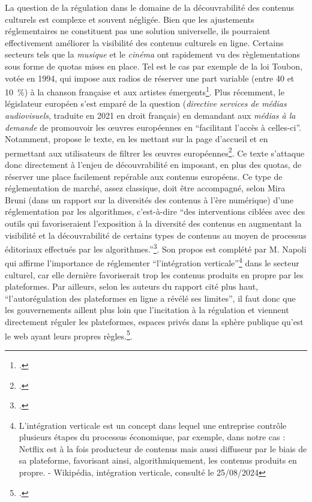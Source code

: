La question de la régulation dans le domaine de la découvrabilité des contenus culturels est complexe et souvent négligée. Bien que les ajustements réglementaires ne constituent pas une solution universelle, ils pourraient effectivement améliorer la visibilité des contenus culturels en ligne. Certains secteurs tels que la \textit{musique} et le \textit{cinéma} ont rapidement vu des règlementations sous forme de quotas mises en place. Tel est le cas par exemple de la loi Toubon, votée en 1994, qui impose aux radios de réserver une part variable (entre 40 et 10 \%) à la chanson française et aux artistes émergents\footcite{noauthor_comprendre_2016}. Plus récemment, le législateur européen s’est emparé de la question (\textit{directive services de médias audiovisuels}, traduite en 2021 en droit français) en demandant aux \textit{médias à la demande} de promouvoir les œuvres européennes en \enquote{facilitant l’accès à celles-ci}. Notamment, propose le texte, en les mettant sur la page d’accueil et en permettant aux utilisateurs de filtrer les œuvres européennes\footcite{noauthor_directive_2019}. Ce texte s’attaque donc directement à l’enjeu de découvrabilité en imposant, en plus des quotas, de réserver une place facilement repérable aux contenus européens. Ce type de réglementation de marché, assez classique, doit être accompagné, selon Mira Bruni (dans un rapport sur la diversités des contenus à l'ère numérique) d'une réglementation par les algorithmes, c'est-à-dire \enquote{des interventions ciblées avec des outils qui favoriseraient l'exposition à la diversité des contenus en augmentant la visibilité et la découvrabilité de certains types de contenus au moyen de processus éditoriaux effectués par les algorithmes.}\footcite{canadien2019}. Son propos est complété par M. Napoli qui affirme l'importance de réglementer \enquote{l'intégration verticale}\footnote{L'intégration verticale est un concept dans lequel une entreprise contrôle plusieurs étapes du processus économique, par exemple, dans notre cas : Netflix est à la fois producteur de contenus mais aussi diffuseur par le biais de sa plateforme, favorisant ainsi, algorithmiquement, les contenus produits  en propre. - Wikipédia, intégration verticale, consulté le 25/08/2024} dans le secteur culturel, car elle dernière favoriserait trop les contenus produits en propre par les plateformes. Par ailleurs, selon les auteurs du rapport cité plus haut, \enquote{l'autorégulation des plateformes en ligne a révélé ses limites}, il faut donc que les gouvernements aillent plus loin que l'incitation à la régulation et viennent directement réguler les plateformes, espaces privés dans la sphère publique qu'est le web ayant leurs propres règles.\footcite{canadien2019}.  

